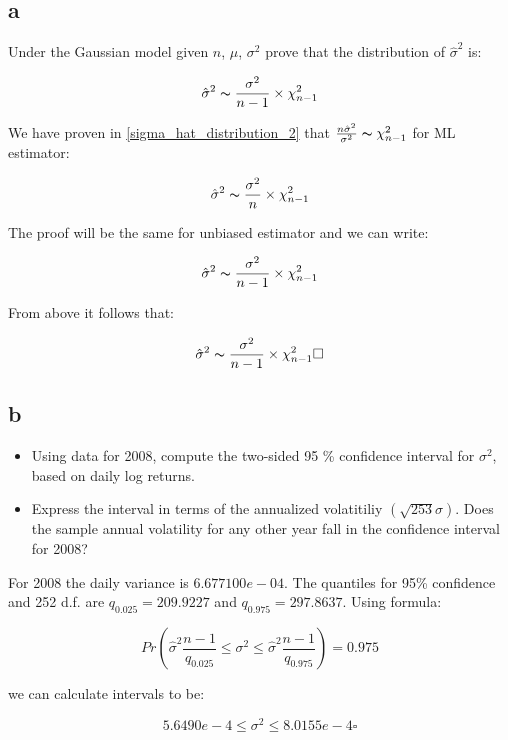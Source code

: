 \subsection{a}
\label{subsection_4_a}
Under the Gaussian model given $n$, $\mu$, $\sigma^2$ prove that the distribution of $\hat{\sigma}^2$ is:

\begin{equation}
\nonumber
\hat{\sigma}^2 \thicksim \frac{\sigma^2}{n-1} \times \chi_{n-1}^2
\end{equation}

\begin{solution}
We have proven in \ref{sigma_hat_distribution_2} that $\frac{n\hat{\sigma}^2}{\sigma^2} \thicksim \chi_{n-1}^2$ for ML estimator:

\begin{equation}
\nonumber
\hat{\sigma}^2 \thicksim \frac{\sigma^2}{n} \times \chi_{n-1}^2
\end{equation}

The proof will be the same for unbiased estimator and we can write:

\begin{equation}
\nonumber
\hat{\sigma}^2 \thicksim \frac{\sigma^2}{n - 1} \times \chi_{n-1}^2
\end{equation}

From above it follows that:

\begin{equation}
\hat{\sigma}^2 \thicksim \frac{\sigma^2}{n-1} \times \chi_{n-1}^2 \square
\end{equation}


\end{solution}

\subsection{b}
\begin{itemize}
\item Using data for 2008, compute the two-sided 95 \% confidence interval for $\sigma^2$, based on daily log returns.
\item Express the interval in terms of the annualized volatitiliy $(\sqrt{253}\sigma)$. Does the sample annual volatility for any other year fall in the 
confidence interval for 2008? 
\end{itemize}

\begin{solution}
For 2008 the daily variance is $6.677100e-04$. The quantiles for 95\% confidence and 252 d.f. are $q_{0.025} = 209.9227$ and $q_{0.975} = 297.8637$.
Using formula:

\begin{equation}
Pr\left(\hat{\sigma}^2\frac{n-1}{q_{0.025}} \leq \sigma^2 \leq \hat{\sigma}^2\frac{n-1}{q_{0.975}} \right) = 0.975
\end{equation}

we can calculate intervals to be:

\begin{equation}
 5.6490e-4 \leq \sigma^2 \leq 8.0155e-4 \square
\end{equation}

\end{solution}

